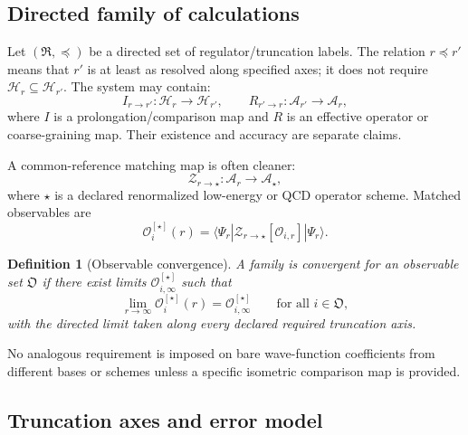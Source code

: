 \documentclass[11pt]{article}
\newtheorem{definition}{Definition}[section]
\newcommand{\Hil}{\mathcal H}
\newcommand{\Alg}{\mathcal A}
\newcommand{\cO}{\mathcal O}
\newcommand{\cZ}{\mathcal Z}
\begin{document}
\subsection{Directed family of calculations}

Let \((\mathfrak R,\preceq)\) be a directed set of regulator/truncation
labels.  The relation \(r\preceq r'\) means that \(r'\) is at least as
resolved along specified axes; it does not require
\(\Hil_r\subseteq\Hil_{r'}\).  The system may contain:
\begin{equation}
 I_{r\to r'}:\Hil_r\longrightarrow\Hil_{r'},
 \qquad
 R_{r'\to r}:\Alg_{r'}\longrightarrow\Alg_r,
\label{eq:comparison-maps}
\end{equation}
where \(I\) is a prolongation/comparison map and \(R\) is an effective
operator or coarse-graining map.  Their existence and accuracy are separate
claims.

A common-reference matching map is often cleaner:
\begin{equation}
 \cZ_{r\to\star}:\Alg_r\longrightarrow\Alg_\star,
\label{eq:common-reference-matching}
\end{equation}
where \(\star\) is a declared renormalized low-energy or QCD operator scheme.
Matched observables are
\begin{equation}
 \cO_i^{[\star]}(r)
 =\langle\Psi_r|
 \cZ_{r\to\star}[\cO_{i,r}]
 |\Psi_r\rangle.
\label{eq:matched-observable}
\end{equation}

\begin{definition}[Observable convergence]
\label{def:observable-convergence}
A family is convergent for an observable set \(\mathfrak O\) if there exist
limits \(\cO_{i,\infty}^{[\star]}\) such that
\begin{equation}
 \lim_{r\to\infty}
 \cO_i^{[\star]}(r)
 =\cO_{i,\infty}^{[\star]}
 \qquad\text{for all }i\in\mathfrak O,
\label{eq:observable-convergence}
\end{equation}
with the directed limit taken along every declared required truncation axis.
\end{definition}

No analogous requirement is imposed on bare wave-function coefficients from
different bases or schemes unless a specific isometric comparison map is
provided.

\subsection{Truncation axes and error model}
\end{document}
